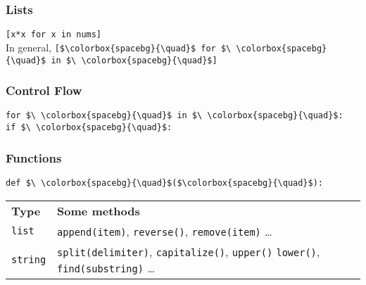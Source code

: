 \documentclass[12pt,twocolumn]{article}
\begin{document}
	\subsubsection*{Lists}
	
	\colorbox{codebg}{\lstinline|[x*x for x in nums]|} \\
	
	In general, \colorbox{codebg}{\lstinline|[$\colorbox{spacebg}{\quad}$ for $\ \colorbox{spacebg}{\quad}$ in $\ \colorbox{spacebg}{\quad}$]|}
	
	\subsubsection*{Control Flow}
	
	\colorbox{codebg}{\lstinline|for $\ \colorbox{spacebg}{\quad}$ in $\ \colorbox{spacebg}{\quad}$:|} \\
	
	\colorbox{codebg}{\lstinline|if $\ \colorbox{spacebg}{\quad}$:|}
	
	\subsubsection*{Functions}
	
	\colorbox{codebg}{\lstinline|def $\ \colorbox{spacebg}{\quad}$($\colorbox{spacebg}{\quad}$):|} \\
	
	\begin{tabular}{ll}
		\textbf{Type} & \textbf{Some methods} \\
		\lstinline|list| & \lstinline|append(item)|, \lstinline|reverse()|, \lstinline|remove(item)| \dots \\
		
		\lstinline|string| & \lstinline|split(delimiter)|, \lstinline|capitalize()|, \lstinline|upper()| \lstinline|lower()|, \lstinline|find(substring)| \dots \\
	\end{tabular}
	
\end{document}
